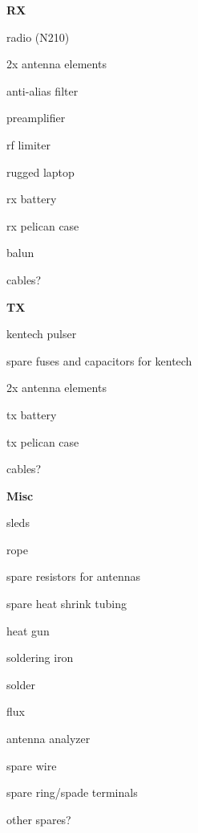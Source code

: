 \documentclass[titlepage]{article}
\begin{document}
\textbf{RX}
\begin{todolist}
    \item radio (N210)
    \item 2x antenna elements
    \item anti-alias filter
    \item preamplifier
    \item rf limiter
    \item rugged laptop
    \item rx battery
    \item rx pelican case
    \item balun
    \item cables?
\end{todolist}
\textbf{TX}
\begin{todolist}
   \item kentech pulser
    \item spare fuses and capacitors for kentech
    \item 2x antenna elements
    \item tx battery
    \item tx pelican case
    \item cables?
\end{todolist}
\textbf{Misc}
\begin{todolist}
    \item sleds
    \item rope
    \item spare resistors for antennas
    \item spare heat shrink tubing
    \item heat gun
    \item soldering iron
    \item solder
    \item flux
    \item antenna analyzer
    \item spare wire
    \item spare ring/spade terminals
    \item other spares?
\end{todolist}
\end{document}
